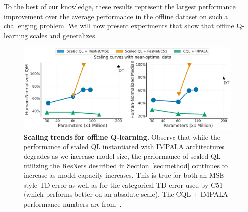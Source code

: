 To the best of our knowledge, these results represent the largest performance improvement over the average performance in the offline dataset on such a challenging problem. We will now present experiments that show that offline Q-learning scales and generalizes.

\begin{figure}[h]
\centering
\vspace{-0.2cm}
\includegraphics[width=0.75\linewidth]{chapters/scaled_ql/figures/scaling_plot_params_with_dt.pdf}
\vspace{-0.2cm}
\caption{\footnotesize{\textbf{Scaling trends for offline Q-learning.} Observe that while the performance of scaled QL instantiated with IMPALA architectures~\citep{espeholt2018impala} degrades as we increase model size, the performance of scaled QL utilizing the ResNets described in Section~\ref{sec:method} continues to increase as model capacity increases. This is true for both an MSE-style TD error as well as for the categorical TD error used by C51 (which performs better on an absolute scale). The CQL + IMPALA performance numbers are from~\citep{lee2022multi}.}
}
\label{fig:scaling}
\vspace{-0.2cm}
\end{figure}

\vspace{-0.05cm}
